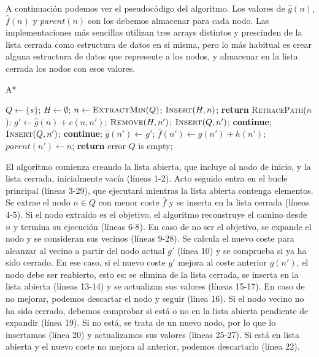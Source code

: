 \documentclass[a4paper,12pt]{article}
\begin{document}
A continuación podemos ver el pseudocódigo del algoritmo. Los valores de $\hat{g}(n)$, $\hat{f}(n)$ y $parent(n)$ son los debemos almacenar para cada nodo. Las implementaciones más sencillas utilizan tres arrays distintos y prescinden de la lista cerrada como estructura de datos en sí misma, pero lo más habitual es crear alguna estructura de datos que represente a los nodos, y almacenar en la lista cerrada los nodos con esos valores.

\begin{algorithm}[h]
\caption{A*}\label{astar}
\begin{algorithmic}[1]
\State $Q \gets \{s\}$;
\State $H \gets \emptyset$;
    \State $n \gets \textsc{ExtractMin}(Q)$;
    \State $\textsc{Insert}(H, n)$;
        \State \textbf{return} \textsc{RetracePath}($n$);
    \EndIf
        \State $g' \gets \hat{g}(n)+c(n, n')$;
                \State $\textsc{Remove}(H, n')$;
                \State $\textsc{Insert}(Q, n')$;
            \Else
                \State \textbf{continue};
            \EndIf
        \Else
                \State $\textsc{Insert}(Q, n')$;
                \State \textbf{continue};
            \EndIf
        \EndIf
        \State $\hat{g}(n') \gets g'$;
        \State $\hat{f}(n') \gets g(n') + h(n')$;
        \State $parent(n') \gets n$;
    \EndFor
\EndWhile
\State \textbf{return} error $Q$ is empty;
\end{algorithmic}
\end{algorithm}

El algoritmo comienza creando la lista abierta, que incluye al nodo de inicio, y la lista cerrada, inicialmente vacía (líneas 1-2). Acto seguido entra en el bucle principal (líneas 3-29), que ejecutará mientras la lista abierta contenga elementos. Se extrae el nodo $n \in Q$ con menor coste $\hat{f}$ y se inserta en la lista cerrada (líneas 4-5). Si el nodo extraído es el objetivo, el algoritmo reconstruye el camino desde $n$ y termina su ejecución (líneas 6-8). En caso de no ser el objetivo, se expande el nodo y se consideran sus vecinos (líneas 9-28). Se calcula el nuevo coste para alcanzar al vecino a partir del nodo actual $g'$ (línea 10) y se comprueba si ya ha sido cerrado. En ese caso, si el nuevo coste $g'$ mejora al coste anterior $\hat{g}(n')$, el nodo debe ser reabierto, esto es: se elimina de la lista cerrada, se inserta en la lista abierta (líneas 13-14) y se actualizan sus valores (líneas 15-17). En caso de no mejorar, podemos descartar el nodo y seguir (línea 16). Si el nodo vecino no ha sido cerrado, debemos comprobar si está o no en la lista abierta pendiente de expandir (línea 19). Si no está, se trata de un nuevo nodo, por lo que lo insertamos (línea 20) y actualizamos sus valores (líneas 25-27). Si está en lista abierta y el nuevo coste no mejora al anterior, podemos descartarlo (línea 22).
\end{document}
